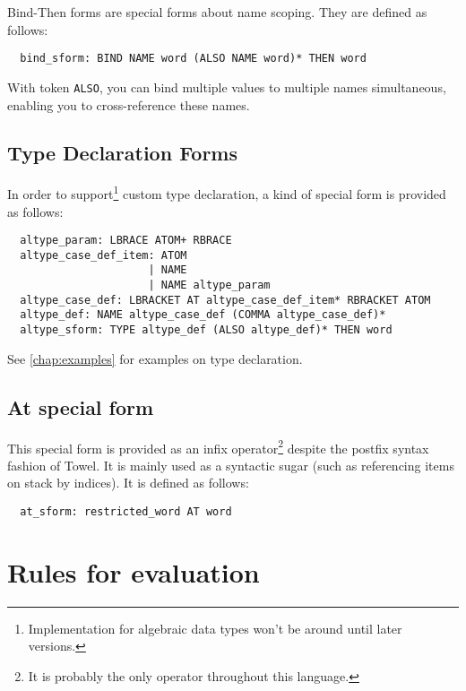 \documentclass{book}
\begin{document}
Bind-Then forms are special forms about name scoping. They are defined as follows:
\begin{verbatim}
  bind_sform: BIND NAME word (ALSO NAME word)* THEN word
\end{verbatim}

With token \texttt{ALSO}, you can bind multiple values to multiple names simultaneous, enabling you to cross-reference these names.

\subsection{Type Declaration Forms}\label{ssec:tdsf}

In order to support\footnote{Implementation for algebraic data types won't be around until later versions.} custom type declaration, a kind of special form is provided as follows:
\begin{verbatim}
  altype_param: LBRACE ATOM+ RBRACE
  altype_case_def_item: ATOM
                      | NAME
                      | NAME altype_param
  altype_case_def: LBRACKET AT altype_case_def_item* RBRACKET ATOM
  altype_def: NAME altype_case_def (COMMA altype_case_def)*
  altype_sform: TYPE altype_def (ALSO altype_def)* THEN word
\end{verbatim}

See \autoref{chap:examples} for examples on type declaration.

\subsection{At special form}

This special form is provided as an infix operator\footnote{It is probably the only operator throughout this language.} despite the postfix syntax fashion of Towel. It is mainly used as a syntactic sugar (such as referencing items on stack by indices). It is defined as follows:
\begin{verbatim}
  at_sform: restricted_word AT word
\end{verbatim}

\section{Rules for evaluation}
\end{document}
